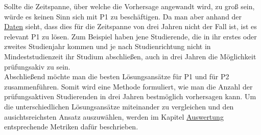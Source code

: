 Sollte die Zeitspanne, \"uber welche die Vorhersage angewandt wird, zu gro{\ss} sein, w\"urde es keinen Sinn sich mit P1 zu besch\"aftigen.
Da man aber anhand der \hyperref[sec:daten]{Daten} sieht, dass dies f\"ur
die Zeitspanne von drei Jahren nicht der Fall ist, ist es relevant P1 zu l\"osen. Zum Beispiel haben jene Studierende, die in ihr erstes oder zweites Studienjahr kommen und je nach Studienrichtung
nicht in Mindeststudienzeit ihr Studium abschlie{\ss}en, auch in drei Jahren die M\"oglichkeit pr\"ufungsakiv zu sein. \\

Abschlie{\ss}end m\"ochte man die besten L\"osungsans\"atze f\"ur P1 und f\"ur P2 zusammenf\"uhren. Somit wird eine Methode formuliert, wie man
die Anzahl der pr\"ufungsaktiven Studierenden in drei Jahren bestm\"oglich vorhersagen kann. Um die unterschiedlichen L\"osungsans\"atze miteinander
zu vergleichen und den ausichtsreichsten Ansatz auszuw\"ahlen, werden im Kapitel \hyperref[sec:auswertung]{Auswertung} entsprechende Metriken daf\"ur beschrieben.